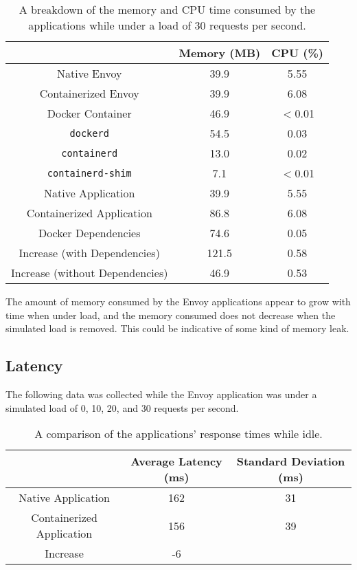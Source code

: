 \documentclass{article}
\begin{document}
\begin{table}[H]
\begin{tabular}{ |c|c|c| }
 \hline
   & Memory (MB) & CPU (\%) \\ 
 \hline
 Native Envoy & 39.9 & 5.55 \\
 \hline
 Containerized Envoy & 39.9 & 6.08 \\
 \hline
 Docker Container & 46.9 & $<$0.01 \\
 \hline
 \texttt{dockerd} & 54.5 & 0.03 \\
 \hline
 \texttt{containerd} & 13.0 & 0.02 \\
 \hline
 \texttt{containerd-shim} & 7.1 & $<$0.01 \\
 \hline\hline
 Native Application & 39.9 & 5.55 \\
 \hline
 Containerized Application & 86.8 & 6.08 \\
 \hline
 Docker Dependencies & 74.6 & 0.05 \\
 \hline\hline
 Increase (with Dependencies) & 121.5 & 0.58 \\
 \hline
 Increase (without Dependencies) & 46.9 & 0.53 \\
 \hline
\end{tabular}
\caption{A breakdown of the memory and CPU time consumed by the applications while under a load of 30 requests per second.}
\label{consumption-breakdown-under-load-30}
\end{table}

The amount of memory consumed by the Envoy applications appear to grow with time when under load, and the memory consumed does not decrease when the simulated load is removed. This could be indicative of some kind of memory leak.

\subsection{Latency}
The following data was collected while the Envoy application was under a simulated load of 0, 10, 20, and 30 requests per second.

\begin{table}[H]
\begin{tabular}{ |c|c|c| }
 \hline
 & Average Latency (ms) & Standard Deviation (ms) \\
 \hline
 Native Application & 162 & 31 \\
 \hline
 Containerized Application & 156 & 39 \\
 \hline\hline
 Increase & -6 & \\
 \hline
\end{tabular}
\caption{A comparison of the applications' response times while idle.}
\label{idle-latency}
\end{table}
\end{document}

